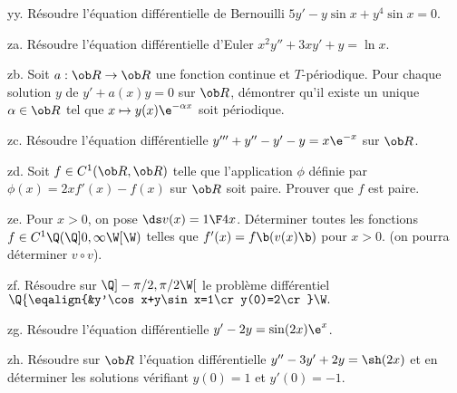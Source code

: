 \exo [Level=1,Fight=2,Learn=2,Field=\EquationsDifférentiellesLinéairesDuPremierOrdre,Type=\Exercices,Origin=,Indication={Procéder au changement de fonction inconnue $z=y^{-3}$.}] yy. 
Résoudre l'équation différentielle de Bernouilli 
$5y'-y\sin x+y^4\sin x=0$. 



\exo [Level=2,Fight=2,Learn=2,Field=\EquationsDifférentiellesLinéairesDuSecondOrdre,Type=\Exercices,Origin=,Indication={Procéder au changement de variable $x=\e^t$.}] za. 
Résoudre l'équation différentielle d'Euler $x^2y''+3xy'+y=\ln x$. 


\exo [Level=1,Fight=3,Learn=1,Field=\EquationsDifférentiellesLinéairesDuPremierOrdre,Type=\Exercices,Origin=] zb. 
Soit $a:\ob R\to\ob R$ une fonction continue et $T$-périodique. Pour chaque solution $y$ de $y'+a(x)y=0$ sur $\ob R$, 
démontrer qu'il existe un unique $\alpha\in\ob R$ tel que $x\mapsto y(x)\e^{-\alpha x}$ 
soit périodique.  

\exo [Level=2,Fight=2,Learn=1,Field=\SystèmesDifférentiels,Type=\Exercices,Origin=] zc. 
Résoudre l'équation différentielle $y'''+y''-y'-y=x\e^{-x}$ sur $\ob R$. 

\exo [Level=1,Fight=3,Learn=2,Field=\EquationsDifférentiellesLinéairesDuPremierOrdre,Type=\Exercices,Origin=] zd. 
Soit $f\in\sc C^1(\ob R,\ob R)$ telle que l'application $\phi$ définie par 
$\phi(x)=2xf'(x)-f(x)$ sur $\ob R$ soit paire. Prouver que $f$ est paire. 

\exo [Level=2,Fight=2,Learn=1,Field=\EquationsDifférentiellesLinéairesDuSecondOrdre,Type=\Exercices,Origin=] ze. 
Pour $x>0$, on pose $\ds v(x)={1\F4x}$. Déterminer toutes les fonctions 
$f\in\sc C^1\Q(\Q]0,\infty\W[\W)$ telles que $f'(x)=f\b(v(x)\b)$ pour $x>0$. (on pourra déterminer $v\circ v$). 

\exo [Level=1,Fight=0,Learn=0,Field=\EquationsDifférentiellesLinéairesDuPremierOrdre,Type=\Exercices,Origin=] zf. 
Résoudre sur $\Q]-\pi/2,\pi/2\W[$ le problème différentiel 
$\Q\{\eqalign{&y'\cos x+y\sin x=1\cr y(0)=2\cr}\W.$

\exo [Level=1,Fight=0,Learn=0,Field=\EquationsDifférentiellesLinéairesDuPremierOrdre,Type=\Exercices,Origin=] zg. 
Résoudre l'équation différentielle $y'-2y=\sin(2x)\e^x$. 

\exo [Level=2,Fight=0,Learn=0,Field=\EquationsDifférentiellesLinéairesDuSecondOrdre,Type=\Exercices,Origin=] zh. 
Résoudre sur $\ob R$ l'équation différentielle $y''-3y'+2y=\sh(2x)$ 
et en déterminer les solutions vérifiant $y(0)=1$ et $y'(0)=-1$. 

